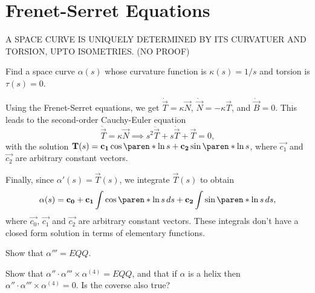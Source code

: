 \documentclass[11pt]{penrose}
\newcommand{\vT}{\vec{T}}
\newcommand{\vN}{\vec{N}}
\newcommand{\vB}{\vec{B}}
\newcommand{\missing}[1]{{\color{red}#1}}
\begin{document}
\section{Frenet-Serret Equations}

\missing{\begin{nthm}
    A SPACE CURVE IS UNIQUELY DETERMINED BY ITS CURVATUER AND TORSION, UPTO ISOMETRIES. (NO PROOF)
\end{nthm}}

\begin{negg}
    Find a space curve $\alpha(s)$ whose curvature function is $\kappa(s) = 1/s$ and torsion is $\tau(s) = 0$.

    Using the Frenet-Serret equations, we get $\dot{\vT} = \kappa \vN$, $\dot{\vN} = - \kappa \vT$, and $\dot{\vB} = 0$. This leads to the second-order Cauchy-Euler equation
    \begin{equation}
        \dot{\vT} = \kappa \vN
        \implies
        s^2 \ddot{\vT} + s \dot{\vT} + \vT = 0,
    \end{equation}
    with the solution $\vT(s) = \vec{c_1} \cos\paren*{\ln s} + \vec{c_2} \sin\paren*{\ln s}$, where $\vec{c_1}$ and $\vec{c_2}$ are arbitrary constant vectors.

    Finally, since $\alpha'(s) = \vT(s)$, we integrate $\vT(s)$ to obtain
    \begin{equation}
        \alpha(s) = \vec{c_0} + \vec{c_1} \int \cos\paren*{\ln s} \,ds + \vec{c_2} \int \sin\paren*{\ln s} \,ds,
    \end{equation}
    where $\vec{c_0}$, $\vec{c_1}$ and $\vec{c_2}$ are arbitrary constant vectors. These integrals don't have a closed form solution in terms of elementary functions.
\end{negg}

\missing{
\begin{nex}
    Show that $\alpha''' = EQQ$.
\end{nex}

\begin{nex}
    Show that $\alpha'' \cdot \alpha''' \times \alpha^{(4)} = EQQ$, and that if $\alpha$ is a helix then $\alpha'' \cdot \alpha''' \times \alpha^{(4)} = 0$. Is the coverse also true?
\end{nex}
}
\end{document}
